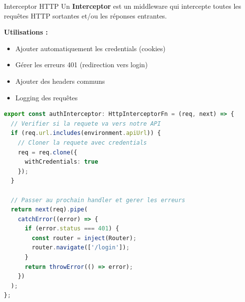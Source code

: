 \documentclass[12pt,a4paper]{article}
\begin{document}
\begin{defbox}{Interceptor HTTP}
Un \textbf{Interceptor} est un middleware qui intercepte toutes les requêtes HTTP sortantes et/ou les réponses entrantes.

\textbf{Utilisations :}
\begin{itemize}
    \item Ajouter automatiquement les credentials (cookies)
    \item Gérer les erreurs 401 (redirection vers login)
    \item Ajouter des headers communs
    \item Logging des requêtes
\end{itemize}
\end{defbox}

\begin{lstlisting}[language=TypeScript, caption=Auth Interceptor - Gestion automatique des cookies]
export const authInterceptor: HttpInterceptorFn = (req, next) => {
  // Verifier si la requete va vers notre API
  if (req.url.includes(environment.apiUrl)) {
    // Cloner la requete avec credentials
    req = req.clone({
      withCredentials: true
    });
  }

  // Passer au prochain handler et gerer les erreurs
  return next(req).pipe(
    catchError((error) => {
      if (error.status === 401) {
        const router = inject(Router);
        router.navigate(['/login']);
      }
      return throwError(() => error);
    })
  );
};
\end{lstlisting}
\end{document}
